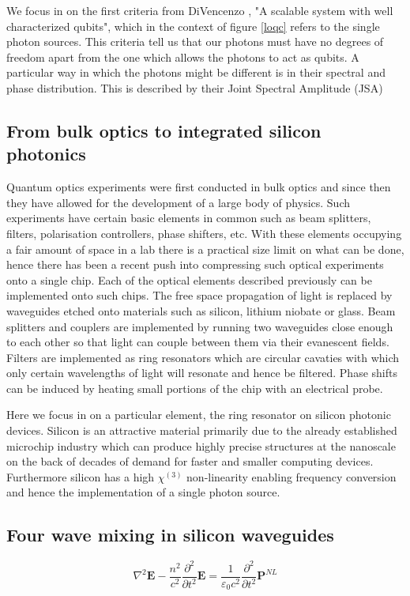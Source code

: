We focus in on the first criteria from DiVencenzo \cite{divincenzo_physical_2000}, "A scalable system with well characterized qubits", which in the context of figure \ref{loqc} refers to the single photon sources. This criteria tell us that our photons must have no degrees of freedom apart from the one which allows the photons to act as qubits. A particular way in which the photons might be different is in their spectral and phase distribution. This is described by their Joint Spectral Amplitude (JSA)



\subsection{From bulk optics to integrated silicon photonics}
Quantum optics experiments were first conducted in bulk optics \cite{burnham_observation_1970} and since then they have allowed for the development of a large body of physics. Such experiments have certain basic elements in common such as beam splitters, filters, polarisation controllers, phase shifters, etc. With these elements occupying a fair amount of space in a lab there is a practical size limit on what can be done, hence there has been a recent push into compressing such optical experiments onto a single chip. Each of the optical elements described previously can be implemented onto such chips. The free space propagation of light is replaced by waveguides etched onto materials such as silicon, lithium niobate or glass. Beam splitters and couplers are implemented by running two waveguides close enough to each other so that light can couple between them via their evanescent fields. Filters are implemented as ring resonators which are circular cavaties with which only certain wavelengths of light will resonate and hence be filtered. Phase shifts can be induced by heating small portions of the chip with an electrical probe.

Here we focus in on a particular element, the ring resonator on silicon photonic devices. Silicon is an attractive material primarily due to the already established microchip industry which can produce highly precise structures at the nanoscale on the back of decades of demand for faster and smaller computing devices. Furthermore silicon has a high $\chi^{(3)}$ non-linearity enabling frequency conversion and hence the implementation of a single photon source.

\subsection{Four wave mixing in silicon waveguides}
\begin{equation}
\nabla^2 \mathbf{E} - \frac{n^2}{c^2}\frac{\partial^2}{\partial t^2}\mathbf{E}
= \frac{1}{\varepsilon_0 c^2}\frac{\partial^2}{\partial t^2}\mathbf{P}^{NL}
\end{equation}

